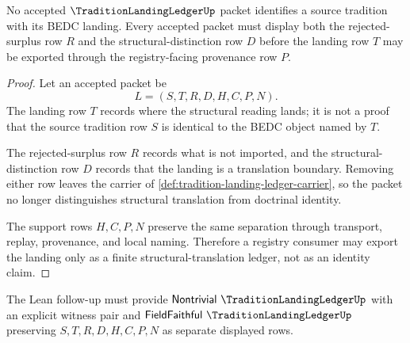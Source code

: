 \begin{theorem}
\label{thm:tradition-landing-ledger-nonidentity}
No accepted $\TraditionLandingLedgerUp$ packet identifies a source tradition with its BEDC landing. Every accepted packet must display both the rejected-surplus row $R$ and the structural-distinction row $D$ before the landing row $T$ may be exported through the registry-facing provenance row $P$.
\end{theorem}
\begin{proof}
Let an accepted packet be
$$
L=(S,T,R,D,H,C,P,N).
$$
The landing row $T$ records where the structural reading lands; it is not a proof that the source tradition row $S$ is identical to the BEDC object named by $T$.

The rejected-surplus row $R$ records what is not imported, and the structural-distinction row $D$ records that the landing is a translation boundary. Removing either row leaves the carrier of \autoref{def:tradition-landing-ledger-carrier}, so the packet no longer distinguishes structural translation from doctrinal identity.

The support rows $H,C,P,N$ preserve the same separation through transport, replay, provenance, and local naming. Therefore a registry consumer may export the landing only as a finite structural-translation ledger, not as an identity claim.
\end{proof}



The Lean follow-up must provide $\mathsf{Nontrivial}\ \TraditionLandingLedgerUp$ with an explicit witness pair and $\mathsf{FieldFaithful}\ \TraditionLandingLedgerUp$ preserving $S,T,R,D,H,C,P,N$ as separate displayed rows.

